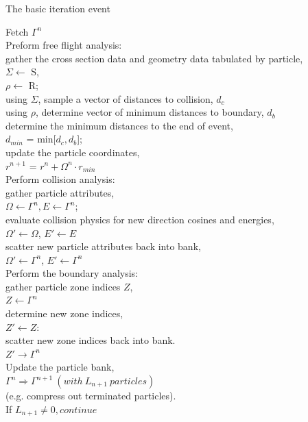 %
\begin{algorithm}
\DontPrintSemicolon
\caption{The basic iteration event}
\label{alg:basicEvent}
{
	 Fetch $\Gamma^{n}$ \\
	 Preform free flight analysis:\\
	\Indp	 gather the cross section data and geometry data tabulated by particle,\\
		 $\Sigma \leftarrow$ S,\\
		 $\rho \leftarrow$ R;\\
		 using $\Sigma$, sample a vector of distances to collision, $d_{c}$\\
		 using $\rho$, determine vector of minimum distances to boundary, $d_{b}$\\
		 determine the minimum distances to the end of event,\\
		\Indp $d_{min}$ = min[$d_{c}, d_{b}$];\\
		\Indm  update the particle coordinates,\\
		\Indp $r^{n+1}$ = $r^{n} + \Omega^{n} \cdot r_{min}$\\
	\Indm  Perform collision analysis:\\
	\Indp  gather particle attributes,\\
	\Indp $\Omega \leftarrow \Gamma^{n}, E \leftarrow \Gamma^{n}$;\\
	\Indm  evaluate collision physics for new direction cosines and energies,\\
	\Indp $\Omega ' \leftarrow \Omega$, $E' \leftarrow  E$\\
	\Indm  scatter new particle attributes back into bank,\\
	\Indp $\Omega ' \leftarrow \Gamma^{n}$, $E' \leftarrow  \Gamma^{n}$\\
	\Indm \Indm  Perform the boundary analysis:\\
	\Indp  gather particle zone indices $Z$,\\
	\Indp $Z \leftarrow \Gamma^{n}$\\
	\Indm  determine new zone indices,\\
	\Indp $Z' \leftarrow Z:$\\
	\Indm  scatter new zone indices back into bank.\\
	\Indp $Z' \rightarrow \Gamma^{n}$\\
	\Indm \Indm  Update the particle bank,\\
	\Indp $\Gamma^{n} \Rightarrow \Gamma^{n+1}\ (with\ L_{n+1}\ particles )$ \\
	(e.g. compress out terminated particles).\\
	\Indm  If $L_{n+1} \neq 0, continue$\\
}
\end{algorithm}
%

